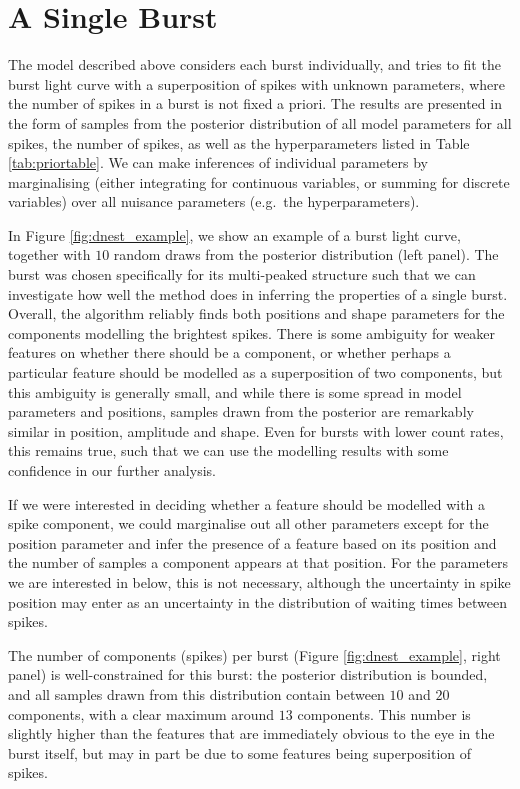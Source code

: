 \documentclass[12pt]{emulateapj}
\begin{document}
\section{A Single Burst}
\label{ch6:oneburst}

The model described above considers each burst individually, and tries to fit the burst light curve with a superposition of spikes with unknown parameters, where the number of
spikes in a burst is not fixed a priori. The results are presented in the form of samples from the posterior distribution of all model parameters for all spikes, the number of spikes,
as well as the hyperparameters listed in Table \ref{tab:priortable}. We can make inferences of individual parameters by marginalising (either integrating for continuous variables, or summing for
discrete variables) over all nuisance parameters (e.g.\ the hyperparameters). 

In Figure \ref{fig:dnest_example}, we show an example of a burst light curve, together with $10$ random draws from the posterior distribution (left panel).
The burst was chosen specifically for its multi-peaked structure such that we can investigate how well the method does in inferring the properties of a single burst. Overall, the algorithm reliably finds both positions and shape parameters for the components modelling
the brightest spikes. There is some ambiguity for weaker features on whether there should be a component, or whether perhaps a
particular feature should be modelled as a superposition of two components, but this ambiguity is generally small, and while there is some
spread in model parameters and positions, samples drawn from the posterior are remarkably similar in position, amplitude and shape. 
Even for bursts with lower count rates, this remains true, such that we can use the modelling results with some confidence in our further analysis.

If we were interested in deciding whether a feature should be modelled with a spike component, we could marginalise out all other parameters
except for the position parameter and infer the presence of a feature based on its position and the number of samples a component appears at
that position. For the parameters we are interested in below, this is not necessary, although the uncertainty in spike position may enter as an 
uncertainty in the distribution of waiting times between spikes.

The number of components (spikes) per burst (Figure \ref{fig:dnest_example}, right panel) is well-constrained for this burst: the posterior distribution is bounded, and all samples drawn
from this distribution contain between $10$ and $20$ components, with a 
clear maximum around $13$ components. This number is slightly higher than the features that are immediately obvious to the eye 
in the burst itself, but may in part be due to some features being superposition of spikes. 
\end{document}
